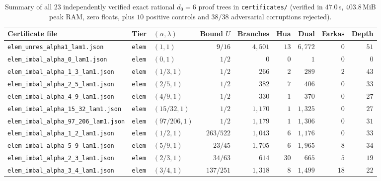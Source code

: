 \documentclass[11pt,a4paper]{amsart}
\theoremstyle{plain}
\theoremstyle{definition}
\theoremstyle{remark}
\begin{document}
\begin{table}[ht]
\centering
\caption{Summary of all $23$ independently verified exact rational $d_0=6$ proof trees in \texttt{certificates/} (verified in $47.0$\,s, $403.8$\,MiB peak RAM, zero floats, plus $10$ positive controls and $38/38$ adversarial corruptions rejected).}
\label{tab:certs}
\scriptsize
\setlength{\tabcolsep}{3.5pt}
\begin{tabular}{@{}lllrrrrrr@{}}
\toprule
Certificate file & Tier & $(\alpha,\lambda)$ & Bound $U$ & Branches & Hua & Dual & Farkas & Depth \\
\midrule
\texttt{elem\_unres\_alpha1\_lam1.json}       & \texttt{elem} & $(1,1)$       & $9/16$         & $4{,}501$  & $13$  & $6{,}772$  & $0$   & $51$  \\
\texttt{elem\_imbal\_alpha\_0\_lam1.json}     & \texttt{elem} & $(0,1)$       & $1/2$          & $0$        & $0$   & $1$        & $0$   & $0$   \\
\texttt{elem\_imbal\_alpha\_1\_3\_lam1.json}  & \texttt{elem} & $(1/3,1)$     & $1/2$          & $266$      & $2$   & $289$      & $2$   & $43$  \\
\texttt{elem\_imbal\_alpha\_2\_5\_lam1.json}  & \texttt{elem} & $(2/5,1)$     & $1/2$          & $382$      & $7$   & $406$      & $0$   & $33$  \\
\texttt{elem\_imbal\_alpha\_4\_9\_lam1.json}  & \texttt{elem} & $(4/9,1)$     & $1/2$          & $330$      & $1$   & $370$      & $0$   & $27$  \\
\texttt{elem\_imbal\_alpha\_15\_32\_lam1.json}& \texttt{elem} & $(15/32,1)$   & $1/2$          & $1{,}170$  & $1$   & $1{,}325$  & $0$   & $27$  \\
\texttt{elem\_imbal\_alpha\_97\_206\_lam1.json}& \texttt{elem}& $(97/206,1)$  & $1/2$          & $1{,}179$  & $1$   & $1{,}306$  & $0$   & $31$  \\
\texttt{elem\_imbal\_alpha\_1\_2\_lam1.json}  & \texttt{elem} & $(1/2,1)$     & $263/522$      & $1{,}043$  & $6$   & $1{,}176$  & $0$   & $33$  \\
\texttt{elem\_imbal\_alpha\_5\_9\_lam1.json}  & \texttt{elem} & $(5/9,1)$     & $23/45$        & $1{,}705$  & $6$   & $1{,}965$  & $8$   & $34$  \\
\texttt{elem\_imbal\_alpha\_2\_3\_lam1.json}  & \texttt{elem} & $(2/3,1)$     & $34/63$        & $614$      & $30$  & $665$      & $5$   & $19$  \\
\texttt{elem\_imbal\_alpha\_3\_4\_lam1.json}  & \texttt{elem} & $(3/4,1)$     & $137/251$      & $1{,}318$  & $8$   & $1{,}499$  & $18$  & $22$  \\

\end{tabular}
\end{table}
\end{document}
